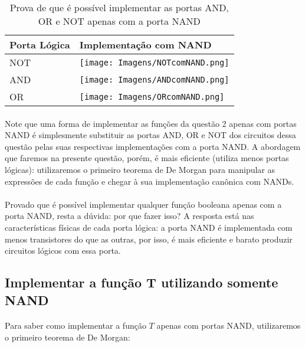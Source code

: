 \documentclass[a4paper, 12pt]{article}
\begin{document}
\begin{table}[H]
    \centering
    \begin{tabular}{|>{\centering\arraybackslash}m{}|>{\centering\arraybackslash}m{}|}
        \hline
        Porta Lógica & Implementação com NAND \\ \hline
        NOT & \texttt{[image: Imagens/NOTcomNAND.png]} \\ \hline
        AND & \texttt{[image: Imagens/ANDcomNAND.png]} \\ \hline
        OR & \texttt{[image: Imagens/ORcomNAND.png]} \\ \hline
    \end{tabular}
    \caption{Prova de que é possível implementar as portas AND, OR e NOT apenas com a porta NAND}
\end{table}

\paragraph{}
Note que uma forma de implementar as funções da questão 2 apenas com portas NAND é simplesmente substituir as portas AND, OR e NOT dos circuitos dessa questão pelas suas respectivas implementações com a porta NAND. A abordagem que faremos na presente questão, porém, é mais eficiente (utiliza menos portas lógicas): utilizaremos o primeiro teorema de De Morgan para manipular as expressões de cada função e chegar à sua implementação canônica com NANDs.

\paragraph{}
Provado que é possível implementar qualquer função booleana apenas com a porta NAND, resta a dúvida: por que fazer isso? A resposta está nas características físicas de cada porta lógica: a porta NAND é implementada com menos transistores do que as outras, por isso, é mais eficiente e barato produzir circuitos lógicos com essa porta.

\subsection{Implementar a função T utilizando somente NAND}
\paragraph{}
Para saber como implementar a função $T$ apenas com portas NAND, utilizaremos o primeiro teorema de De Morgan:
\end{document}

